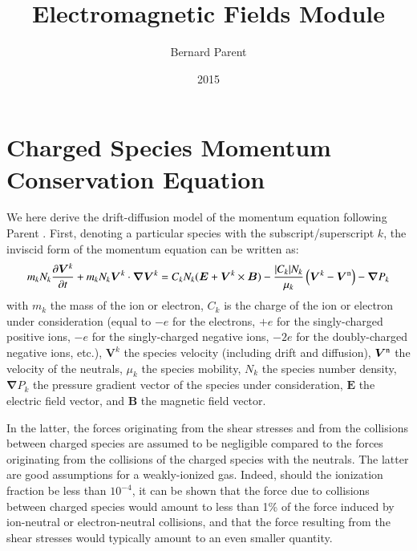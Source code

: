 \documentclass{warpdoc}
\author{
  Bernard Parent
}
\title{
  Electromagnetic Fields Module  
}
\date{
  2015
}
\renewcommand{\vec}[1]{\bm{#1}}
\begin{document}
  \pagestyle{headings}
  \setcounter{page}{1}
  \makewarpdoctitle
  \tableofcontents




\section{Charged Species Momentum Conservation Equation}


We here derive the drift-diffusion model of the momentum equation following Parent \cite{jcp:2011:parent}.  First, denoting a particular species with the subscript/superscript $k$, the inviscid form of the momentum equation can be written as:
%
\begin{equation}
  m_{k} N_k \frac{{\partial} \vec{V}^k}{\partial t} 
  +m_{k} N_k \vec{V}^k \cdot \vec{\nabla} \vec{V}^k 
  =
  C_k N_k (\vec{E}+\vec{V}^k\times \vec{B})-\frac{|C_k|N_k}{\mu_k} \left( \vec{V}^k -\vec{V}^{\rm n} \right) -\vec{\nabla} P_k
\end{equation}
%
with $m_k$ the mass of the ion or electron, $C_k$ is the charge of the ion or electron under consideration (equal to $-e$ for the electrons, $+e$ for the singly-charged positive ions, $-e$ for the singly-charged negative ions, $-2e$ for the doubly-charged negative ions, etc.), $\vec{V}^k$ the species velocity (including drift and diffusion), $\vec{V}^{\rm n}$ the velocity of the neutrals, $\mu_k$ the species mobility, $N_k$ the species number density, $\vec{\nabla} P_k$ the pressure gradient vector of the species under consideration,  $\vec{E}$  the electric field vector, and $\vec{B}$ the magnetic field vector. 


In the latter, the forces originating from the shear stresses and from the collisions between charged species are assumed to be negligible compared to the forces originating from the collisions of the charged species with the neutrals. The latter are good assumptions for a weakly-ionized gas. Indeed, should the ionization fraction be less than $10^{-4}$, it can be shown that the force due to collisions between charged species would amount to less than 1\% of the force induced by ion-neutral or electron-neutral collisions, and that the force resulting from the shear stresses would typically amount to an even smaller quantity.
\end{document}

